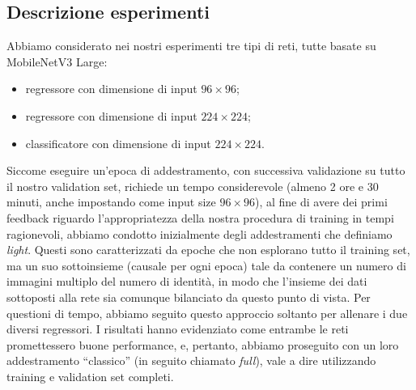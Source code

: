 \begin{comment}
    Descrivere gli esperimenti effettuati e, per ognuno di essi, riportare i risultati sul training e sul validation set in forma tabellare. Analizzare e commentare i risultati nel dettaglio, tirando fuori delle conclusioni motivate dai risultati sperimentali. Eventuali esperimenti aggiuntivi possono essere riportati in questa sezione.
\end{comment}

\subsection{Descrizione esperimenti}

\begin{comment}
    3 esperimenti:
    - regressore 224x244
    - classificatore 224x224
    - regressore 96x96
    Come cosa aggiuntiva, epoche non full che fanno comunque paura
\end{comment}

Abbiamo considerato nei nostri esperimenti tre tipi di reti, tutte basate su MobileNetV3 Large:
\begin{itemize}
    \item regressore con dimensione di input $96 \times 96$;
    \item regressore con dimensione di input $224 \times 224$;
    \item classificatore con dimensione di input $224 \times 224$.
\end{itemize}

Siccome eseguire un'epoca di addestramento, con successiva validazione su tutto il nostro validation set, richiede un tempo considerevole (almeno 2 ore e 30 minuti, anche impostando come input size $96 \times 96$), al fine di avere dei primi feedback riguardo l'appropriatezza della nostra procedura di training in tempi ragionevoli, abbiamo condotto inizialmente degli addestramenti che definiamo \emph{light}. Questi sono caratterizzati da epoche che non esplorano tutto il training set, ma un suo sottoinsieme (causale per ogni epoca) tale da contenere un numero di immagini multiplo del numero di identità, in modo che l'insieme dei dati sottoposti alla rete sia comunque bilanciato da questo punto di vista.
Per questioni di tempo, abbiamo seguito questo approccio soltanto per allenare i due diversi regressori. I risultati hanno evidenziato come entrambe le reti promettessero buone performance, e, pertanto, abbiamo proseguito con un loro addestramento ``classico'' (in seguito chiamato \emph{full}), vale a dire utilizzando training e validation set completi.

